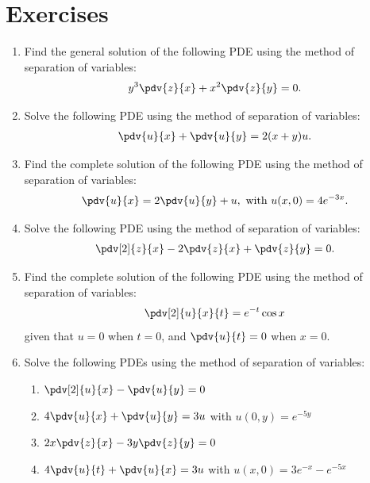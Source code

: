\section*{Exercises}
    \begin{enumerate}
        \item Find the general solution of the following PDE using the method of separation of variables:
        \begin{align*}
            y^3\pdv{z}{x}+x^2\pdv{z}{y}=0.
        \end{align*}

        \item Solve the following PDE using the method of separation of variables:
        \begin{align*}
            \pdv{u}{x}+\pdv{u}{y}=2(x+y)u.
        \end{align*}

        \item Find the complete solution of the following PDE using the method of separation of variables:
        \begin{align*}
            \pdv{u}{x}=2\pdv{u}{y}+u,\text{ with }u(x,0)=4e^{-3x}.
        \end{align*}

        \item Solve the following PDE using the method of separation of variables:
        \begin{align*}
            \pdv[2]{z}{x}-2\pdv{z}{x}+\pdv{z}{y}=0.
        \end{align*}

        \item Find the complete solution of the following PDE using the method of separation of variables:
        \begin{align*}
            \pdv[2]{u}{x}{t}=e^{-t}\cos{x}
        \end{align*}
        given that $u=0$ when $t=0$, and $\pdv{u}{t}=0$ when $x=0$.

        \item Solve the following PDEs using the method of separation of variables:
        \begin{enumerate}
            \item $\pdv[2]{u}{x}-\pdv{u}{y}=0$
            \item $4\pdv{u}{x}+\pdv{u}{y}=3u$ with $u(0,y)=e^{-5y}$
            \item $2x\pdv{z}{x}-3y\pdv{z}{y}=0$
            \item $4\pdv{u}{t}+\pdv{u}{x}=3u$ with $u(x,0)=3e^{-x}-e^{-5x}$
        \end{enumerate}
    \end{enumerate}